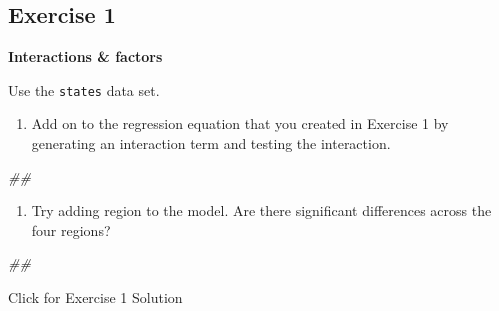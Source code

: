 \documentclass[
]{book}
\newenvironment{Shaded}{\begin{snugshade}}{\end{snugshade}}
\newcommand{\CommentTok}[1]{\textcolor[rgb]{0.56,0.35,0.01}{\textit{#1}}}
\providecommand{\tightlist}{%
  \setlength{\itemsep}{0pt}\setlength{\parskip}{0pt}}
\begin{document}
\hypertarget{exercise-1-1}{%
\subsection{Exercise 1}\label{exercise-1-1}}

\textbf{Interactions \& factors}

Use the \texttt{states} data set.

\begin{enumerate}
\def\labelenumi{\arabic{enumi}.}
\tightlist
\item
  Add on to the regression equation that you created in Exercise 1 by generating an interaction term and testing the interaction.
\end{enumerate}

\begin{Shaded}
\begin{Highlighting}[]
\CommentTok{\#\# }
\end{Highlighting}
\end{Shaded}

\begin{enumerate}
\def\labelenumi{\arabic{enumi}.}
\setcounter{enumi}{1}
\tightlist
\item
  Try adding region to the model. Are there significant differences across the four regions?
\end{enumerate}

\begin{Shaded}
\begin{Highlighting}[]
\CommentTok{\#\# }
\end{Highlighting}
\end{Shaded}

{Click for Exercise 1 Solution}
\end{document}
